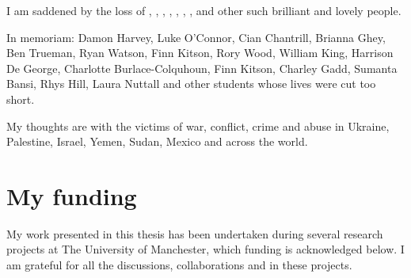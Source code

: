I am saddened by the loss of , , , , , , , and other such brilliant and lovely people. 

In memoriam: Damon Harvey, Luke O'Connor, Cian Chantrill, Brianna Ghey, Ben Trueman, Ryan Watson, Finn Kitson, Rory Wood, William King, Harrison De George, Charlotte Burlace-Colquhoun, Finn Kitson, Charley Gadd, Sumanta Bansi, Rhys Hill, Laura Nuttall and other students whose lives were cut too short.

My thoughts are with the victims of war, conflict, crime and abuse in Ukraine, Palestine, Israel, Yemen, Sudan, Mexico and across the world.

\newpage
\section{My funding}

My work presented in this thesis has been undertaken during 
several research projects at The University of Manchester, 
which funding is acknowledged below. I am grateful for all the discussions, collaborations and in these projects.

